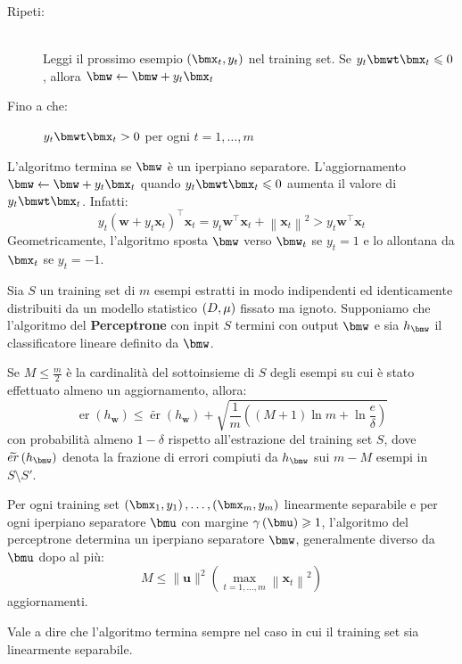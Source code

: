 \documentclass[\main/main.tex]{subfiles}
\begin{document}
\begin{multicols}{2}
\begin{definition}[Perceptrone]
\begin{description}
        \item[Ripeti:]\~\\
            Leggi il prossimo esempio \(\rnd{\bmx_t, y_t}\) nel training set.
            Se \(y_t\bmwt\bmx_t\leq 0\), allora \(\bmw \leftarrow \bmw + y_t\bmx_t\)
        \item[Fino a che:] \(y_t\bmwt\bmx_t > 0\) per ogni \(t=1,\ldots,m\)
    \end{description}
    L'algoritmo termina se \(\bmw\) è un iperpiano separatore. L'aggiornamento \(\bmw \leftarrow \bmw + y_t\bmx_t\) quando \(y_t\bmwt\bmx_t \leq 0\) aumenta il valore di \(y_t\bmwt\bmx_t\). Infatti:
    \[y_{t}\left(\boldsymbol{w}+y_{t} \boldsymbol{x}_{t}\right)^{\top} \boldsymbol{x}_{t}=y_{t} \boldsymbol{w}^{\top} \boldsymbol{x}_{t}+\left\|\boldsymbol{x}_{t}\right\|^{2}>y_{t} \boldsymbol{w}^{\top} \boldsymbol{x}_{t}\]
    Geometricamente, l'algoritmo sposta \(\bmw\) verso \(\bmw_t\) se \(y_t = 1\) e lo allontana da \(\bmx_t\) se \(y_t = -1\).
\end{definition}
\begin{corollary}
    Sia \(S\) un training set di \(m\) esempi estratti in modo indipendenti ed identicamente distribuiti da un modello statistico \(\left(D,\mu\right)\) fissato ma ignoto. Supponiamo che l'algoritmo del \textbf{Perceptrone} con inpit \(S\) termini con output \(\bmw\) e sia \(h_{\bmw}\) il classificatore lineare definito da \(\bmw\).
    
    Se \(M \leq \frac{m}{2}\) è la cardinalità del sottoinsieme di \(S\) degli esempi su cui è stato effettuato almeno un aggiornamento, allora:
    \[
        \operatorname{er}\left(h_{\boldsymbol{w}}\right) \leq \widetilde{\operatorname{er}}\left(h_{\boldsymbol{w}}\right)+\sqrt{\frac{1}{m}\left((M+1) \ln m+\ln \frac{e}{\delta}\right)}
    \]
    con probabilità almeno \(1-\delta\) rispetto all'estrazione del training set \(S\), dove \(\tilde{er}\rnd{h_{\bmw}}\) denota la frazione di errori compiuti da \(h_{\bmw}\) sui \(m-M\) esempi in \(S\setminus S'\).
\end{corollary}
\end{multicols}
\begin{theorem}
    Per ogni training set \(\examples{m}\) linearmente separabile e per ogni iperpiano separatore \(\bmu\) con margine \(\gamma\rnd{\bmu} \geq 1\), l'algoritmo del perceptrone determina un iperpiano separatore \(\bmw\), generalmente diverso da \(\bmu\) dopo al più:
    \[M \leq\|\boldsymbol{u}\|^{2}\left(\max _{t=1, \ldots, m}\left\|\boldsymbol{x}_{t}\right\|^{2}\right)\]
    aggiornamenti.
    
    Vale a dire che l'algoritmo termina sempre nel caso in cui il training set sia linearmente separabile.
\end{theorem}
\end{document}
